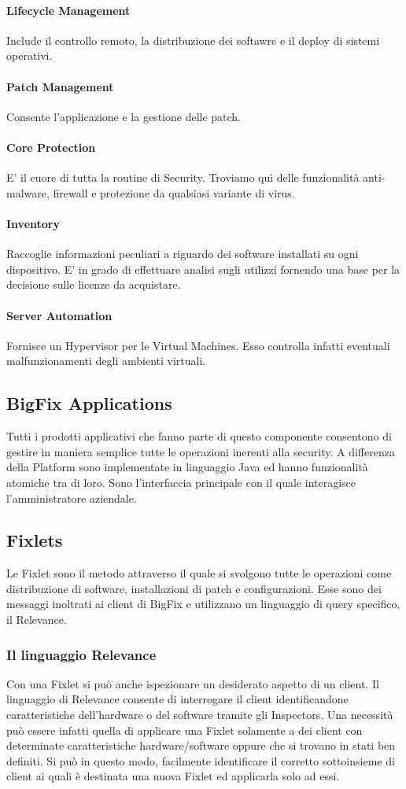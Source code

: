 \paragraph{Lifecycle Management}
Include il controllo remoto, la distribuzione dei softawre e il deploy di sistemi operativi.
\paragraph{Patch Management}
Consente l'applicazione e la gestione delle patch.
\paragraph{Core Protection}
E' il cuore di tutta la routine di Security. Troviamo quì delle funzionalità anti-malware, firewall e protezione da qualsiasi variante di virus.
\paragraph{Inventory }
Raccoglie informazioni peculiari a riguardo dei software installati su ogni dispositivo. E' in grado di effettuare analisi sugli utilizzi fornendo una base per la decisione sulle licenze da acquistare.
\paragraph{Server Automation}
Fornisce un Hypervisor per le Virtual Machines. Esso controlla infatti eventuali malfunzionamenti degli ambienti virtuali.
\subsection{BigFix Applications}
Tutti i prodotti applicativi che fanno parte di questo componente consentono di gestire in maniera semplice tutte le operazioni inerenti alla security. A differenza della Platform sono implementate in linguaggio Java ed hanno funzionalità atomiche tra di loro. Sono l'interfaccia principale con il quale interagisce l'amministratore aziendale.
\subsection{Fixlets}
Le Fixlet sono il metodo attraverso il quale si svolgono tutte le operazioni come distribuzione di software, installazioni di patch e configurazioni. Esse sono dei messaggi inoltrati ai client di BigFix e utilizzano un linguaggio di query specifico, il Relevance.
\subsubsection{Il linguaggio Relevance}
Con una Fixlet si può anche ispezionare un desiderato aspetto di un client. Il linguaggio di Relevance consente di interrogare il client identificandone caratteristiche dell'hardware o del software tramite gli Inspectors. Una necessità può essere infatti quella di applicare una Fixlet solamente a dei client con determinate caratteristiche hardware/software oppure che si trovano in stati ben definiti. Si può in questo modo, facilmente identificare il corretto sottoinsieme di client ai quali è destinata una nuova Fixlet ed applicarla solo ad essi.

